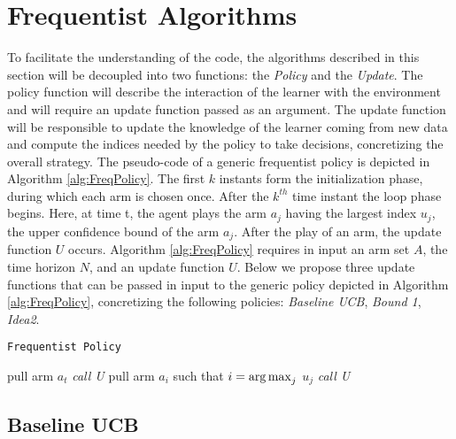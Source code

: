 \section{Frequentist Algorithms}
To facilitate the understanding of the code, the algorithms described in this section will be decoupled into two functions: the \emph{Policy} and the \emph{Update}. The policy function will describe the interaction of the learner with the environment and will require an update function passed as an argument. The update function will be responsible to update the knowledge of the learner coming from new data and compute the indices needed by the policy to take decisions, concretizing the overall strategy. The pseudo-code of a generic frequentist policy is depicted in Algorithm \ref{alg:FreqPolicy}.  The first $k$ instants form the initialization phase, during which  each arm is chosen once. After the $k^{th}$ time instant the loop phase begins. Here, at time t, the agent plays the arm $a_j$ having the largest index $u_j$, the upper confidence bound of the arm $a_j$. After the play of an arm, the update function $U$ occurs.
Algorithm \ref{alg:FreqPolicy} requires in input an arm set $A$, the time horizon $N$, and an update function $U$. Below we propose three update functions that can be passed in input to the generic policy depicted in Algorithm \ref{alg:FreqPolicy}, concretizing the following policies: \emph{Baseline UCB}, \emph{Bound 1}, \emph{Idea2}.

\begin{algorithm}[H]
	\caption{\texttt{Frequentist Policy}}
	\begin{scriptsize}
		\begin{algorithmic}[1]						
			 
			\State pull arm $a_t$\;
			\State \emph{call U}\;
			\EndFor
			 
			\State pull arm $a_i$ such that  $i = \operatorname*{arg\,max}_j$ $u_j $\;
			\State \emph{call U}\;
			\EndFor
			\EndFunction			
		\end{algorithmic}
	\end{scriptsize}
	\label{alg:FreqPolicy}
\end{algorithm}



\subsection{Baseline UCB}

